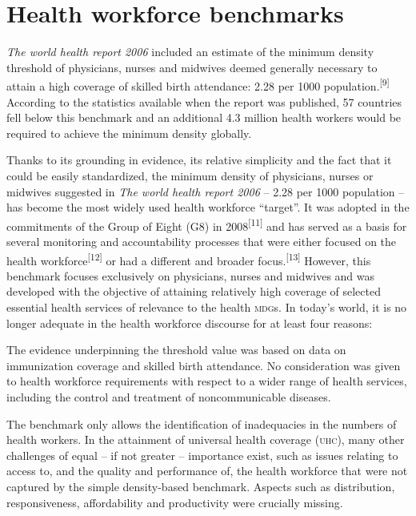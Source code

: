 \documentclass{article}
\begin{document}
\section{Health workforce benchmarks}

\textit{The world health report 2006}
included an estimate of the minimum density
threshold of physicians, nurses and midwives deemed generally necessary to
attain a high coverage of
skilled birth attendance: 2.28 per 1000
population.\textsuperscript{[}\textsuperscript{9}\textsuperscript{]}
According to the statistics available when the report was published, 57
countries fell below this benchmark and an additional 4.3 million health workers
would be required
to achieve the minimum density globally.

Thanks to its grounding in evidence, its relative simplicity and the fact that
it could be easily
standardized, the minimum density of physicians, nurses or midwives suggested in
\textit{The world
health report 2006}
– 2.28 per 1000 population – has become the most widely
used health workforce “target”. It was adopted in the commitments of the Group
of
Eight (G8) in 2008\textsuperscript{[}\textsuperscript{11}\textsuperscript{]}
and has served as a basis for
several monitoring and accountability processes that were either focused on the
health
workforce\textsuperscript{[}\textsuperscript{12}\textsuperscript{]}
or had a different and broader
focus.\textsuperscript{[}\textsuperscript{13}\textsuperscript{]}
However, this benchmark focuses
exclusively on physicians, nurses and midwives and was developed with the
objective of attaining
relatively high coverage of selected essential health services of relevance to
the health \textsc{mdg}s. In
today's world, it is no longer adequate in the health workforce discourse for at
least four
reasons:

The evidence underpinning the threshold value was based on data on immunization
coverage and
skilled birth attendance. No consideration was given to health workforce
requirements with respect
to a wider range of health services, including the control and treatment of
noncommunicable
diseases.

The benchmark only allows the identification of inadequacies in the numbers of
health workers. In
the attainment of universal health coverage (\textsc{uhc}), many other challenges of
equal – if not
greater – importance exist, such as issues relating to access to, and the
quality and
performance of, the health workforce that were not captured by the simple
density-based benchmark.
Aspects such as distribution, responsiveness, affordability and productivity
were crucially
missing.
\end{document}
